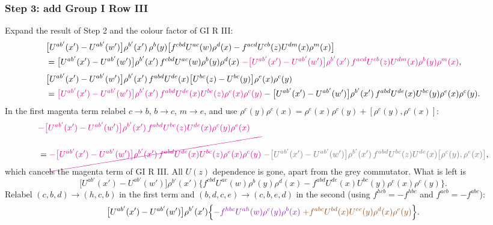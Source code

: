 \documentclass[9pt]{article}
\newcommand{\Vi}[1]{{\color{cV}#1}}
\newcommand{\Br}[1]{{\color{cN}#1}}
\newcommand{\Ma}[1]{{\color{cM}#1}}
\newcommand{\Gr}[1]{{\color{cX}#1}}
\numberwithin{equation}{section}
\begin{document}
\subsubsection*{Step 3: add Group I Row III}
Expand the result of Step 2 and the colour factor of GI R III:
\begin{align}
&\big[U^{ab'}(x')-U^{ab'}(w')\big]\rho^{b'}(x')\,\rho^{b}(y)\big[f^{cbd}U^{ac}(w)\rho^{d}(x)-f^{acd}U^{cb}(z)U^{dm}(x)\rho^{m}(x)\big]\notag\\
&=\big[U^{ab'}(x')-U^{ab'}(w')\big]\rho^{b'}(x')\,f^{cbd}U^{ac}(w)\rho^{b}(y)\rho^{d}(x)\;\Ma{-\big[U^{ab'}(x')-U^{ab'}(w')\big]\rho^{b'}(x')\,f^{acd}U^{cb}(z)U^{dm}(x)\rho^{b}(y)\rho^{m}(x)},\notag\\[3pt]
&\big[U^{ab'}(x')-U^{ab'}(w')\big]\rho^{b'}(x')\,f^{abd}U^{de}(x)\big[U^{bc}(z)-U^{bc}(y)\big]\rho^{e}(x)\rho^{c}(y)\notag\\
&=\Ma{\big[U^{ab'}(x')-U^{ab'}(w')\big]\rho^{b'}(x')\,f^{abd}U^{de}(x)U^{bc}(z)\rho^{e}(x)\rho^{c}(y)}-\big[U^{ab'}(x')-U^{ab'}(w')\big]\rho^{b'}(x')\,f^{abd}U^{de}(x)U^{bc}(y)\rho^{e}(x)\rho^{c}(y).
\end{align}
In the first \Ma{magenta} term relabel $c\to b$, $b\to c$, $m\to e$, and use $\rho^{c}(y)\rho^{e}(x)=\rho^{e}(x)\rho^{c}(y)+[\rho^{c}(y),\rho^{e}(x)]$:
\begin{align}
&\Ma{-\big[U^{ab'}(x')-U^{ab'}(w')\big]\rho^{b'}(x')\,f^{abd}U^{bc}(z)U^{de}(x)\rho^{c}(y)\rho^{e}(x)}\notag\\
&=\Ma{\cancel{-\big[U^{ab'}(x')-U^{ab'}(w')\big]\rho^{b'}(x')\,f^{abd}U^{de}(x)U^{bc}(z)\rho^{e}(x)\rho^{c}(y)}}\;\Gr{-\big[U^{ab'}(x')-U^{ab'}(w')\big]\rho^{b'}(x')\,f^{abd}U^{bc}(z)U^{de}(x)\big[\rho^{c}(y),\rho^{e}(x)\big]},
\end{align}
which cancels the \Ma{magenta} term of GI R III. All $U(z)$ dependence is gone, apart from the grey commutator. What is left is
\begin{equation}
\big[U^{ab'}(x')-U^{ab'}(w')\big]\rho^{b'}(x')\Big\{f^{cbd}U^{ac}(w)\rho^{b}(y)\rho^{d}(x)-f^{abd}U^{de}(x)U^{bc}(y)\rho^{e}(x)\rho^{c}(y)\Big\}.
\end{equation}
Relabel $(c,b,d)\to(h,c,b)$ in the first term and $(b,d,c,e)\to(c,b,e,d)$ in the second (using $f^{hcb}=-f^{hbc}$ and $f^{acb}=-f^{abc}$):
\begin{equation}
\big[U^{ab'}(x')-U^{ab'}(w')\big]\rho^{b'}(x')\Big\{\Vi{-f^{hbc}U^{ah}(w)\rho^{c}(y)\rho^{b}(x)}\;\Br{+f^{abc}U^{bd}(x)U^{ce}(y)\rho^{d}(x)\rho^{e}(y)}\Big\}.
\end{equation}
\end{document}
